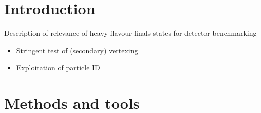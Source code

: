 \documentclass[preprint]{elsarticle}
\begin{document}
\tableofcontents



\section{Introduction}

Description of relevance of heavy flavour finals states for detector benchmarking

\begin{itemize}
\item Stringent test of (secondary) vertexing
\item Exploitation of particle ID
\end{itemize}


\section{Methods and tools}
\end{document}
